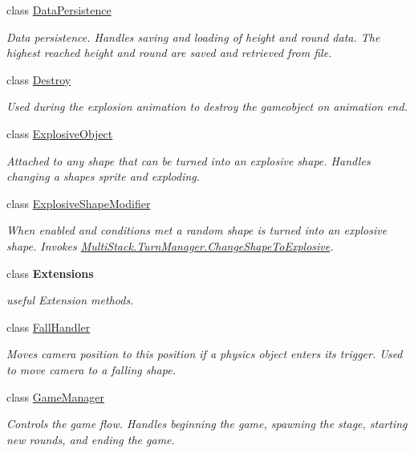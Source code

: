 \begin{DoxyCompactItemize}
class \hyperlink{class_multi_stack_1_1_data_persistence}{Data\+Persistence}
\begin{DoxyCompactList}\small\item\em Data persistence. Handles saving and loading of height and round data. The highest reached height and round are saved and retrieved from file. \end{DoxyCompactList}\item 
class \hyperlink{class_multi_stack_1_1_destroy}{Destroy}
\begin{DoxyCompactList}\small\item\em Used during the explosion animation to destroy the gameobject on animation end. \end{DoxyCompactList}\item 
class \hyperlink{class_multi_stack_1_1_explosive_object}{Explosive\+Object}
\begin{DoxyCompactList}\small\item\em Attached to any shape that can be turned into an explosive shape. Handles changing a shapes sprite and exploding. \end{DoxyCompactList}\item 
class \hyperlink{class_multi_stack_1_1_explosive_shape_modifier}{Explosive\+Shape\+Modifier}
\begin{DoxyCompactList}\small\item\em When enabled and conditions met a random shape is turned into an explosive shape. Invokes \hyperlink{class_multi_stack_1_1_turn_manager_a4366a75c5431c6d38c2feeb650f07d54}{Multi\+Stack.\+Turn\+Manager.\+Change\+Shape\+To\+Explosive}. \end{DoxyCompactList}\item 
class {\bfseries Extensions}
\begin{DoxyCompactList}\small\item\em useful Extension methods. \end{DoxyCompactList}\item 
class \hyperlink{class_multi_stack_1_1_fall_handler}{Fall\+Handler}
\begin{DoxyCompactList}\small\item\em Moves camera position to this position if a physics object enters its trigger. Used to move camera to a falling shape. \end{DoxyCompactList}\item 
class \hyperlink{class_multi_stack_1_1_game_manager}{Game\+Manager}
\begin{DoxyCompactList}\small\item\em Controls the game flow. Handles beginning the game, spawning the stage, starting new rounds, and ending the game. \end{DoxyCompactList}\item 

\end{DoxyCompactItemize}
